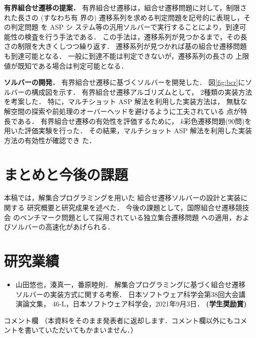 \documentclass[a4j,10pt,dvipdfmx]{jarticle}
\begin{document}
\begin{multicols}{1}
\textbf{有界組合せ遷移の提案．} 
有界組合せ遷移は，組合せ遷移問題に対して，制限された長さの (すなわち有
界の) 遷移系列を求める判定問題を記号的に表現し，その判定問題 を ASP シ
ステム等の汎用ソルバーで実行することにより，到達可能性の検査を行う手法である．
この手法は，遷移系列が見つかるまで，その長さの制限を大きくしつつ繰り返す．
遷移系列が見つかれば基の組合せ遷移問題も到達可能となる．
一般に到達不能は判定できないが，遷移系列の長さの
上限値が既知である場合は判定可能となる．
%

\textbf{ソルバーの開発．}
有界組合せ遷移に基づくソルバーを開発した．
図\ref{fig:bcr}にソルバーの構成図を示す．
有界組合せ遷移アルゴリズムとして，
2種類の実装方法を考案した．
特に，マルチショット ASP 解法を利用した実装方法は，
無駄な解空間の探索や前処理のオーバーヘッドを避けるように工夫されている
点が特長である．
有界組合せ遷移の有効性を評価するために，
$k$彩色遷移問題(90問)を用いた評価実験を行った．
その結果，マルチショット ASP 解法を利用した実装方法の有効性が確認でき
た．

\section{まとめと今後の課題}
本稿では，解集合プログラミングを用いた
組合せ遷移ソルバーの設計と実装に関する
研究概要と研究成果を述べた．
今後の課題として，国際組合せ遷移競技会
のベンチマーク問題として採用されている独立集合遷移問題
への適用，およびソルバーの高速化があげられる．

\section{研究業績}
\begin{itemize}
\item 山田悠也，湊真一，番原睦則．
  解集合プログラミングに基づく組合せ遷移ソルバーの実装方式に関する考察．
  日本ソフトウェア科学会第38回大会講演論文集，
  46-L，日本ソフトウェア科学会，2021年9月3日．
  {\bf (学生奨励賞)}
\end{itemize}




\end{multicols}
\vfill
\noindent
{\gt コメント欄}
{\footnotesize
（本資料をそのまま発表者に返却します．コメント欄以外にもコメントを書いていただいてもかまいません．）}
\\
\fbox{\begin{minipage}{\textwidth}\noindent\\\\\end{minipage}}	
\end{document}
